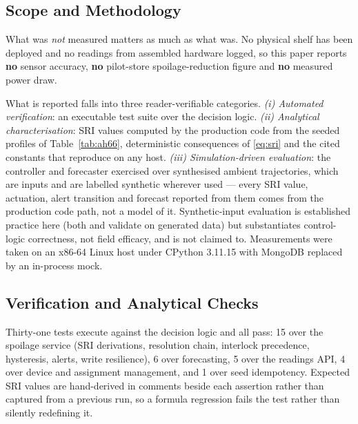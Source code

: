 \documentclass[conference]{IEEEtran}
\begin{document}
\subsection{Scope and Methodology}

What was \emph{not} measured matters as much as what was. No physical
shelf has been deployed and no readings from assembled hardware logged, so
this paper reports \textbf{no} sensor accuracy, \textbf{no} pilot-store
spoilage-reduction figure and \textbf{no} measured power draw.

What is reported falls into three reader-verifiable categories.
\emph{(i) Automated verification}: an executable test suite over the
decision logic. \emph{(ii) Analytical characterisation}: SRI values
computed by the production code from the seeded profiles of
Table~\ref{tab:ah66}, deterministic consequences of \eqref{eq:sri} and the
cited constants that reproduce on any host.
\emph{(iii) Simulation-driven evaluation}: the controller and forecaster
exercised over synthesised ambient trajectories, which are inputs and are
labelled synthetic wherever used --- every SRI value, actuation, alert
transition and forecast reported from them comes from the production code
path, not a model of it. Synthetic-input evaluation is established
practice here (both \cite{singh2025} and \cite{rbm2026} validate on
generated data) but substantiates control-logic correctness, not field
efficacy, and is not claimed to. Measurements were taken on an x86-64
Linux host under CPython 3.11.15 with MongoDB replaced by an in-process
mock.

\subsection{Verification and Analytical Checks}

Thirty-one tests execute against the decision logic and all pass: 15 over
the spoilage service (SRI derivations, resolution chain, interlock
precedence, hysteresis, alerts, write resilience), 6 over forecasting, 5
over the readings API, 4 over device and assignment management, and 1 over
seed idempotency. Expected SRI values are hand-derived in comments beside
each assertion rather than captured from a previous run, so a formula
regression fails the test rather than silently redefining it.
\end{document}
